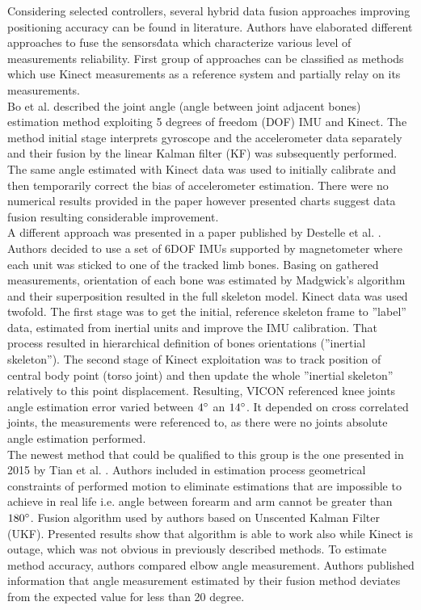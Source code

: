 \documentclass[9pt]{llncs}
\begin{document}
Considering selected controllers, several hybrid data fusion approaches improving positioning accuracy can be found in literature. Authors have elaborated different approaches to fuse the sensors\' data which characterize various level of measurements reliability. First group of approaches can be classified as methods which use Kinect measurements as a reference system and partially relay on its measurements.\\
Bo et al. \cite{Bo2011} described the joint angle (angle between joint adjacent bones) estimation method exploiting 5 degrees of freedom (DOF) IMU and Kinect. The method initial stage interprets gyroscope and the accelerometer data separately and their fusion by the linear Kalman filter (KF) was subsequently performed. The same angle estimated with Kinect data was used to initially calibrate and then temporarily correct the bias of accelerometer estimation. There were no numerical results provided in the paper however presented charts suggest data fusion resulting considerable improvement.\\
A different approach was presented in a paper published by Destelle et al. \cite{Destelle2014}. Authors decided to use a set of 6DOF IMUs supported by magnetometer where each unit was sticked to one of the tracked limb bones. Basing on gathered measurements, orientation of each bone was estimated by Madgwick's algorithm \cite{Madgwick2010} and their superposition resulted in the full skeleton model. Kinect data was used twofold. The first stage was to get the initial, reference skeleton frame to ''label'' data, estimated from inertial units and improve the IMU calibration. That process resulted in hierarchical definition of bones orientations (''inertial skeleton''). The second stage of Kinect exploitation was to track position of central body point (torso joint) and then update the whole ''inertial skeleton'' relatively to this point displacement. Resulting, VICON referenced knee joints angle estimation error varied between $4\degree$ an $14\degree$. It depended on cross correlated joints, the measurements were referenced to, as there were no joints absolute angle estimation performed.\\
The newest method that could be qualified to this group is the one presented in 2015 by Tian et al. \cite{Tian2015}. Authors included in estimation process geometrical constraints of performed motion to eliminate estimations that are impossible to achieve in real life i.e. angle between forearm and arm cannot be greater than $180\degree$. Fusion algorithm used by authors based on Unscented Kalman Filter (UKF)\cite{Wan2000}. Presented results show that algorithm is able to work also while Kinect is outage, which was not obvious in previously described methods. To estimate method accuracy, authors compared elbow angle measurement. Authors published information that angle measurement estimated by their fusion method deviates from the expected value for less than 20 degree.\\
\end{document}
